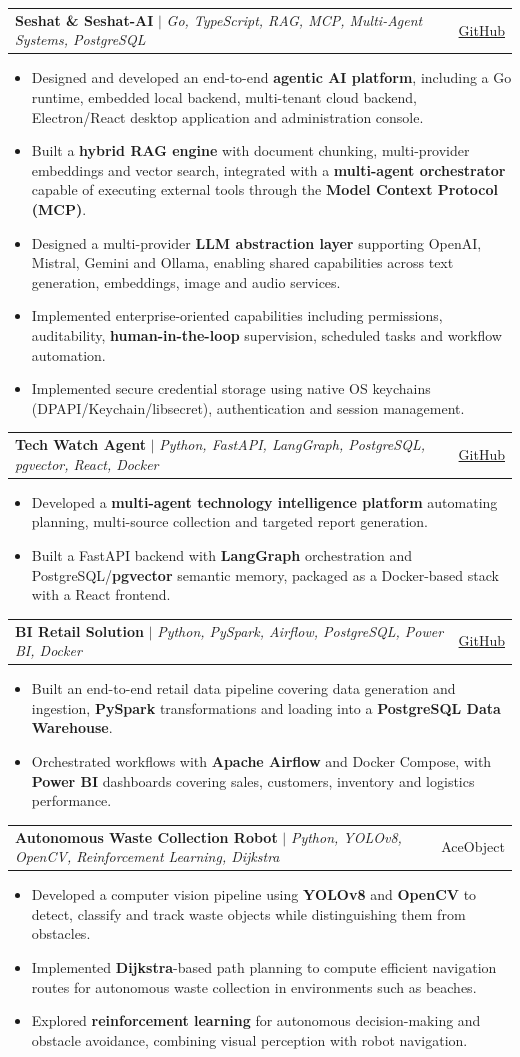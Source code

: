 \documentclass[a4paper,11pt]{article}
\makeatletter
\newcommand{\resumeItem}[1]{
  \item\small{{#1 \vspace{-1.5pt}}}
}
\newcommand{\resumeProjectHeading}[2]{
    \Needspace{6\baselineskip}
    \vspace{2pt}\item
    \begin{tabular*}{0.97\textwidth}{l@{\extracolsep{\fill}}r}
      \small#1 & #2 \\
    \end{tabular*}\vspace{-3pt}
}
\newcommand{\resumeItemListStart}{\begin{itemize}[leftmargin=0.15in, label={\small\textbullet}, itemsep=1.5pt, parsep=0pt, topsep=2pt, partopsep=0pt]}
\newcommand{\resumeItemListEnd}{\end{itemize}\vspace{-1pt}}
\makeatother
\begin{document}
\resumeProjectHeading
{\textbf{Seshat \& Seshat-AI} $|$ \emph{Go, TypeScript, RAG, MCP, Multi-Agent Systems, PostgreSQL}}{\href{https://github.com/EngineerProjects/seshat}{GitHub}}
\resumeItemListStart
  \resumeItem{Designed and developed an end-to-end \textbf{agentic AI platform}, including a Go runtime, embedded local backend, multi-tenant cloud backend, Electron/React desktop application and administration console.}
  \resumeItem{Built a \textbf{hybrid RAG engine} with document chunking, multi-provider embeddings and vector search, integrated with a \textbf{multi-agent orchestrator} capable of executing external tools through the \textbf{Model Context Protocol (MCP)}.}
  \resumeItem{Designed a multi-provider \textbf{LLM abstraction layer} supporting OpenAI, Mistral, Gemini and Ollama, enabling shared capabilities across text generation, embeddings, image and audio services.}
  \resumeItem{Implemented enterprise-oriented capabilities including permissions, auditability, \textbf{human-in-the-loop} supervision, scheduled tasks and workflow automation.}
  \resumeItem{Implemented secure credential storage using native OS keychains (DPAPI/Keychain/libsecret), authentication and session management.}
\resumeItemListEnd

\resumeProjectHeading
{\textbf{Tech Watch Agent} $|$ \emph{Python, FastAPI, LangGraph, PostgreSQL, pgvector, React, Docker}}{\href{https://github.com/EngineerProjects/tech-watch-agent}{GitHub}}
\resumeItemListStart
  \resumeItem{Developed a \textbf{multi-agent technology intelligence platform} automating planning, multi-source collection and targeted report generation.}
  \resumeItem{Built a FastAPI backend with \textbf{LangGraph} orchestration and PostgreSQL/\textbf{pgvector} semantic memory, packaged as a Docker-based stack with a React frontend.}
\resumeItemListEnd

\resumeProjectHeading
{\textbf{BI Retail Solution} $|$ \emph{Python, PySpark, Airflow, PostgreSQL, Power BI, Docker}}
{\href{https://github.com/EngineerProjects/BI_Retail}{GitHub}}
\resumeItemListStart
  \resumeItem{Built an end-to-end retail data pipeline covering data generation and ingestion, \textbf{PySpark} transformations and loading into a \textbf{PostgreSQL Data Warehouse}.}
  \resumeItem{Orchestrated workflows with \textbf{Apache Airflow} and Docker Compose, with \textbf{Power BI} dashboards covering sales, customers, inventory and logistics performance.}
\resumeItemListEnd

\resumeProjectHeading
{\textbf{Autonomous Waste Collection Robot} $|$ \emph{Python, YOLOv8, OpenCV, Reinforcement Learning, Dijkstra}}
{AceObject}
\resumeItemListStart
  \resumeItem{Developed a computer vision pipeline using \textbf{YOLOv8} and \textbf{OpenCV} to detect, classify and track waste objects while distinguishing them from obstacles.}
  \resumeItem{Implemented \textbf{Dijkstra}-based path planning to compute efficient navigation routes for autonomous waste collection in environments such as beaches.}
  \resumeItem{Explored \textbf{reinforcement learning} for autonomous decision-making and obstacle avoidance, combining visual perception with robot navigation.}
\resumeItemListEnd
\end{document}
